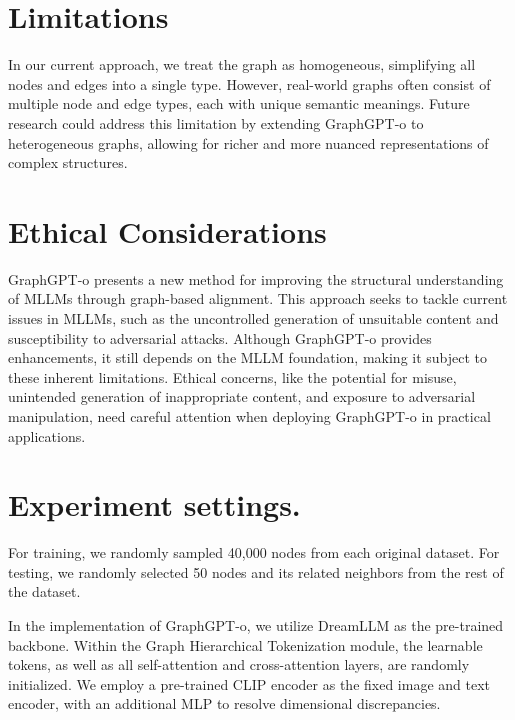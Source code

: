 \clearpage
\setcounter{page}{1}
\maketitlesupplementary

\section{Limitations}
In our current approach, we treat the graph as homogeneous, simplifying all nodes and edges into a single type. However, real-world graphs often consist of multiple node and edge types, each with unique semantic meanings. Future research could address this limitation by extending GraphGPT-o to heterogeneous graphs, allowing for richer and more nuanced representations of complex structures.

\section{Ethical Considerations}
GraphGPT-o presents a new method for improving the structural understanding of MLLMs through graph-based alignment. This approach seeks to tackle current issues in MLLMs, such as the uncontrolled generation of unsuitable content and susceptibility to adversarial attacks. Although GraphGPT-o provides enhancements, it still depends on the MLLM foundation, making it subject to these inherent limitations. Ethical concerns, like the potential for misuse, unintended generation of inappropriate content, and exposure to adversarial manipulation, need careful attention when deploying GraphGPT-o in practical applications.




\section{Experiment settings.}
For training, we randomly sampled 40,000 nodes from each original dataset. For testing, we randomly selected 50 nodes and its related neighbors from the rest of the dataset.

In the implementation of GraphGPT-o, we utilize DreamLLM as the pre-trained backbone. Within the Graph Hierarchical Tokenization module, the learnable tokens, as well as all self-attention and cross-attention layers, are randomly initialized. We employ a pre-trained CLIP encoder as the fixed image and text encoder, with an additional MLP to resolve dimensional discrepancies.


